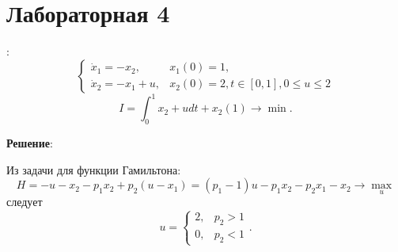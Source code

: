 \documentclass[a4paper, 12pt]{article}
\begin{document}
\section{Лабораторная 4}

{}:
\begin{equation}
    \begin{cases}
        \dot x_1 =-x_2, & x_1(0)=1,\\
        \dot x_2=-x_1+u,& x_2(0)=2, t \in [0,1], 0\leq u \leq 2
    \end{cases}
\end{equation}
\begin{equation}
    I=\int_0^{1} x_2 + u dt +x_2(1) \rightarrow \min.
\end{equation}

{\bf Решение}:

Из задачи для функции Гамильтона:
\begin{equation}
    H=-u-x_2-p_1 x_2 + p_2 (u-x_1)=(p_1-1) u - p_1 x_2 -p_2 x_1 -x_2 \rightarrow \max_u
\end{equation}
следует
\begin{equation}
    u=
    \begin{cases}
        2,&p_2>1\\
        0,&p_2<1
    \end{cases}.
\end{equation}
\end{document}

